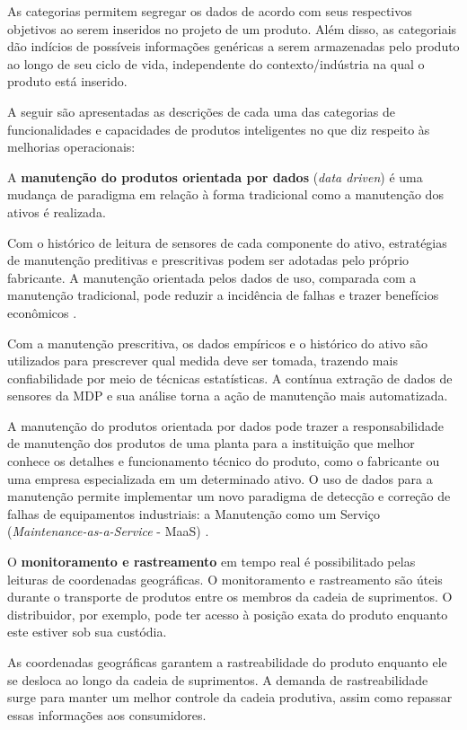 As categorias permitem segregar os dados de acordo com seus respectivos objetivos ao serem inseridos no projeto de um produto. Além disso, as categoriais dão indícios de possíveis informações genéricas a serem armazenadas pelo produto ao longo de seu ciclo de vida, independente do contexto/indústria na qual o produto está inserido.

A seguir são apresentadas as descrições de cada uma das categorias de funcionalidades e capacidades de produtos inteligentes no que diz respeito às melhorias operacionais:

A \textbf{manutenção do produtos orientada por dados} (\textit{data driven})  é uma mudança de paradigma em relação à forma tradicional como a manutenção dos ativos é realizada.

Com o histórico de leitura de sensores de cada componente do ativo, estratégias de manutenção preditivas e prescritivas podem ser adotadas pelo próprio fabricante. A manutenção orientada pelos dados de uso, comparada com a manutenção tradicional, pode reduzir a incidência de falhas e trazer benefícios econômicos \cite{odonovan2015maintenance}.

Com a manutenção prescritiva, os dados empíricos e o histórico do ativo são utilizados para prescrever qual medida deve ser tomada, trazendo mais confiabilidade por meio de técnicas estatísticas. A contínua extração de dados de sensores da MDP e sua análise torna a ação de manutenção mais automatizada.

A manutenção do produtos orientada por dados pode trazer a responsabilidade de manutenção dos produtos de uma planta para a instituição que melhor conhece os detalhes e funcionamento técnico do produto, como o fabricante ou uma empresa especializada em um determinado ativo. O uso de dados para a manutenção permite implementar um novo paradigma de detecção e correção de falhas de equipamentos industriais: a Manutenção como um Serviço (\textit{Maintenance-as-a-Service} - MaaS)  \cite{zoll2018maas}.

O \textbf{monitoramento e rastreamento} em tempo real é possibilitado pelas leituras de coordenadas geográficas. O monitoramento e rastreamento são úteis durante o transporte de produtos entre os membros da cadeia de suprimentos. O distribuidor, por exemplo, pode ter acesso à posição exata do produto enquanto este estiver sob sua custódia.

As coordenadas geográficas garantem a rastreabilidade do produto enquanto ele se desloca ao longo da cadeia de suprimentos. A demanda de rastreabilidade surge para manter um melhor controle da cadeia produtiva, assim como repassar essas informações aos consumidores.

